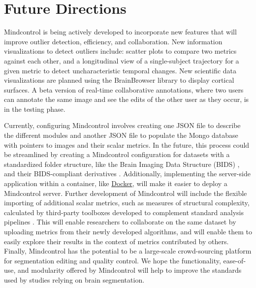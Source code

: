 \section{Future Directions}

Mindcontrol is being actively developed to incorporate new features that will improve outlier detection, efficiency, and collaboration. New information visualizations to detect outliers include: scatter plots to compare two metrics against each other, and a longitudinal view of a single-subject trajectory for a given metric to detect uncharacteristic temporal changes. New scientific data visualizations are planned using the BrainBrowser library \cite{Sherif_2015} to display cortical surfaces. A beta version of real-time collaborative annotations, where two users can annotate the same image and see the edits of the other user as they occur, is in the testing phase. 

Currently, configuring Mindcontrol involves creating one JSON file to describe the different modules and another JSON file to populate the Mongo database with pointers to images and their scalar metrics. In the future, this process could be streamlined by creating a Mindcontrol configuration for datasets with a standardized folder structure, like the Brain Imaging Data Structure (BIDS) \cite{Gorgolewski_2016}, and their BIDS-compliant derivatives \cite{gorgolewski2016bids}. Additionally, implementing the server-side application within a container, like \href{https://www.docker.com/}{Docker}, will make it easier to deploy a Mindcontrol server. Further development of Mindcontrol will include the flexible importing of additional scalar metrics, such as measures of structural complexity, calculated by third-party toolboxes developed to complement standard analysis pipelines \cite{madan2016,madan2017}. This will enable researchers to collaborate on the same dataset by uploading metrics from their newly developed algorithms, and will enable them to easily explore their results in the context of metrics contributed by others. Finally, Mindcontrol has the potential to be a large-scale crowd-sourcing platform for segmentation editing and quality control. We hope the functionality, ease-of-use, and modularity offered by Mindcontrol will help to improve the standards used by studies relying on brain segmentation. 